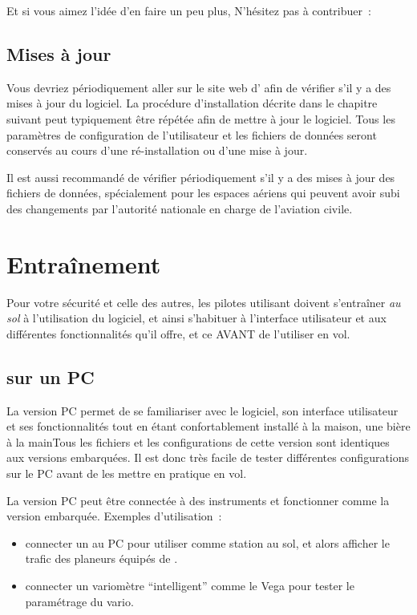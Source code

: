 Et si vous aimez l'idée d'en faire un peu plus, N'hésitez pas à contribuer~:
\begin{quote}
\end{quote}

\subsection*{Mises à jour}
Vous devriez périodiquement aller sur le site web d'\xc{} afin de vérifier s'il
y a des mises à jour du logiciel. La procédure d'installation décrite dans le chapitre suivant peut typiquement
être répétée afin de mettre à jour le logiciel. Tous les paramètres de configuration
de l'utilisateur et les fichiers de données seront conservés au cours
d'une ré-installation ou d'une mise à jour.

Il est aussi recommandé de vérifier périodiquement s'il y a des mises à jour des fichiers
de données, spécialement pour les espaces aériens qui peuvent avoir subi des 
changements par l'autorité nationale en charge de l'aviation civile.

\section{Entraînement}
Pour votre sécurité et celle des autres, les pilotes utilisant \xc{} doivent s'entraîner \emph{au sol}
à l'utilisation du logiciel, et ainsi s'habituer à l'interface utilisateur et aux différentes fonctionnalités qu'il offre, et ce AVANT de l'utiliser en vol.

\subsection*{\xc{} sur un PC}
La version PC permet de se familiariser avec le logiciel, son interface utilisateur et ses fonctionnalités tout en étant confortablement installé à la maison, une bière à la main\textellipsis Tous les fichiers et les configurations de cette version sont identiques aux versions embarquées. Il est donc très facile de tester différentes configurations sur le PC avant de les mettre en pratique en vol.

La version PC peut être connectée à des instruments et fonctionner comme la version embarquée. Exemples d'utilisation~:
\begin{itemize}
\item connecter un \fl{} au PC pour utiliser \xc{} comme station au sol, et alors afficher le trafic des planeurs équipés de \fl.
\item connecter un variomètre ``intelligent'' comme le Vega pour tester le paramétrage du vario.
\end{itemize}

